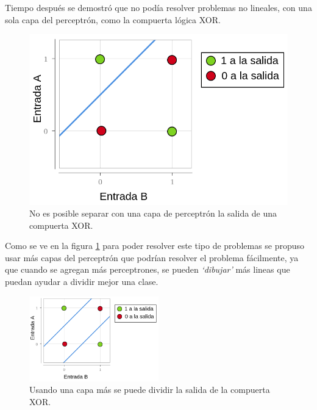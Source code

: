 \par Tiempo después se demostró que no podía resolver problemas no lineales, con una sola capa del perceptrón, como la compuerta lógica XOR.
\begin{figure}[H]
	\begin{minipage}{0.5\textwidth}
		
	\end{minipage}%
	\begin{minipage}{0.5\textwidth}
		\includegraphics[width=\textwidth]{imagenes/diagramaXor.png}
	\end{minipage}
	\caption{No es posible separar con una capa de perceptrón la salida de una compuerta XOR.}
	\label{fig:xor}
\end{figure}


\par Como se ve en la figura \ref{fig:xor} para poder resolver este tipo de problemas se propuso usar más capas del perceptrón que podrían resolver el problema fácilmente, ya que cuando se agregan más perceptrones, se pueden \textit{`dibujar'} más lineas que puedan ayudar a dividir mejor una clase.

\begin{figure}[H]
	\centering
	\includegraphics[width=0.5\textwidth]{imagenes/diagramaXor2.png}
	\caption{Usando una capa más se puede dividir la salida de la compuerta XOR.}
	\label{fig:xor2}
\end{figure}

